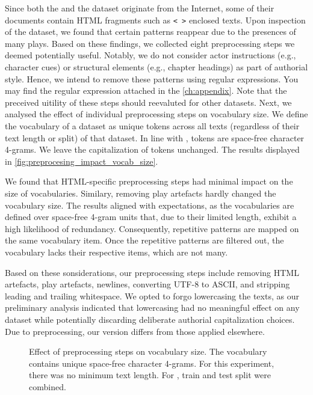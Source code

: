Since both the \dataBlog{} and the \dataPan{} dataset originate from the Internet, some of their documents contain HTML fragments such as \texttt{< >} enclosed texts.
Upon inspection of the \dataGutenberg{} dataset, we found that certain patterns reappear due to the presences of many plays.
Based on these findings, we collected eight preprocessing steps we deemed potentially useful. 
Notably, we do not consider actor instructions (e.g., character cues) or structural elements (e.g., chapter headings) as part of authorial style.
Hence, we intend to remove these patterns using regular expressions.
You may find the regular expression attached in the \autoref{ch:appendix}.
Note that the preceived uitility of these steps should reevaluted for other datasets.
Next, we analysed the effect of individual preprocessing steps on vocabulary size.  
We define the vocabulary of a dataset as unique tokens across all texts (regardless of their text length or split) of that dataset.
In line with \citep{koppel_determining_2014}, tokens are space-free character 4-grams.
We leave the capitalization of tokens unchanged. 
The results displayed in \autoref{fig:preprocesing_impact_vocab_size}.

We found that HTML-specific preprocessing steps had minimal impact on the size of vocabularies.
Similary, removing play artefacts hardly changed the vocabulary size.
The results aligned with expectations, as the vocabularies are defined over space-free 4-gram units that, due to their limited length, exhibit a high likelihood of redundancy.
Consequently, repetitive patterns are mapped on the same vocabulary item.
Once the repetitive patterns are filtered out, the vocabulary lacks their respective items, which are not many.

Based on these sonsiderations, our preprocessing steps include removing HTML artefacts, play artefacts, newlines, converting UTF-8 to ASCII, and stripping leading and trailing whitespace.
We opted to forgo lowercasing the texts, as our preliminary analysis indicated that lowercasing had no meaningful effect on any dataset while potentially discarding deliberate authorial capitalization choices.
Due to preprocessing, our \dataPan{} version differs from those applied elsewhere.

\begin{figure}[htbp]
    \centering
    
    \caption{Effect of preprocessing steps on vocabulary size. The vocabulary contains unique space-free character 4-grams.
    For this experiment, there was no minimum text length.
    For \dataPan{}, train and test split were combined.}
    \label{fig:preprocesing_impact_vocab_size}
\end{figure}


